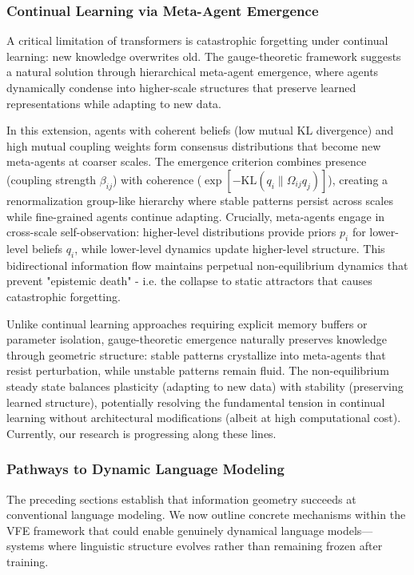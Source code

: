 \documentclass[twoside,11pt]{article}
\begin{document}
\subsubsection{Continual Learning via Meta-Agent Emergence}

A critical limitation of transformers is catastrophic forgetting under continual learning: new knowledge overwrites old. The gauge-theoretic framework suggests a natural solution through hierarchical meta-agent emergence, where agents dynamically condense into higher-scale structures that preserve learned representations while adapting to new data.

In this extension, agents with coherent beliefs (low mutual KL divergence) and high mutual coupling weights form consensus distributions that become new meta-agents at coarser scales. The emergence criterion combines presence (coupling strength $\beta_{ij}$) with coherence ($\exp[-\mathrm{KL}(q_i \| \Omega_{ij} q_j)]$), creating a renormalization group-like hierarchy where stable patterns persist across scales while fine-grained agents continue adapting. Crucially, meta-agents engage in cross-scale self-observation: higher-level distributions provide priors $p_i$ for lower-level beliefs $q_i$, while lower-level dynamics update higher-level structure. This bidirectional information flow maintains perpetual non-equilibrium dynamics that prevent "epistemic death" - i.e. the collapse to static attractors that causes catastrophic forgetting.

Unlike continual learning approaches requiring explicit memory buffers or parameter isolation, gauge-theoretic emergence naturally preserves knowledge through geometric structure: stable patterns crystallize into meta-agents that resist perturbation, while unstable patterns remain fluid. The non-equilibrium steady state balances plasticity (adapting to new data) with stability (preserving learned structure), potentially resolving the fundamental tension in continual learning without architectural modifications (albeit at high computational cost). Currently, our research is progressing along these lines.

\subsubsection{Pathways to Dynamic Language Modeling}
\label{sec:dynamic_language}

The preceding sections establish that information geometry succeeds at conventional language modeling. We now outline concrete mechanisms within the VFE framework that could enable genuinely dynamical language models---systems where linguistic structure evolves rather than remaining frozen after training.
\end{document}
